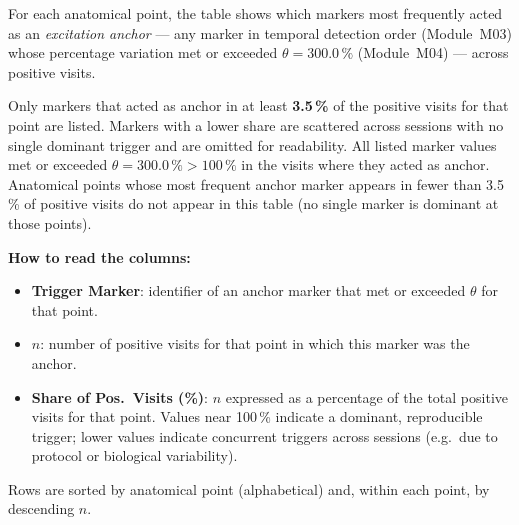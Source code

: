 \documentclass[a4paper,11pt]{article}
\begin{document}
For each anatomical point, the table shows which markers most frequently acted as an
\emph{excitation anchor} --- any marker in temporal detection order (Module~M03)
whose percentage variation met or exceeded $\theta = 300.0\,\%$
(Module~M04) --- across positive visits.

\medskip
Only markers that acted as anchor in at least \textbf{3.5\,\%}
of the positive visits for that point are listed.
Markers with a lower share are scattered across sessions with no single dominant trigger
and are omitted for readability.
All listed marker values met or exceeded $\theta = 300.0\,\% > 100\,\%$ in the
visits where they acted as anchor.
Anatomical points whose most frequent anchor marker appears in fewer than
3.5\,\% of positive visits do not appear in this table (no single
marker is dominant at those points).

\medskip
\noindent\textbf{How to read the columns:}
\begin{itemize}
  \item \textbf{Trigger Marker}: identifier of an anchor marker that met or exceeded $\theta$
        for that point.
  \item \textbf{$n$}: number of positive visits for that point in which this marker was
        the anchor.
  \item \textbf{Share of Pos.\ Visits (\%)}: $n$ expressed as a percentage of the total
        positive visits for that point.
        Values near 100\,\% indicate a dominant, reproducible trigger;
        lower values indicate concurrent triggers across sessions (e.g.\ due to
        protocol or biological variability).
\end{itemize}

\medskip
\noindent Rows are sorted by anatomical point (alphabetical) and, within each point, by
descending $n$.
\end{document}
